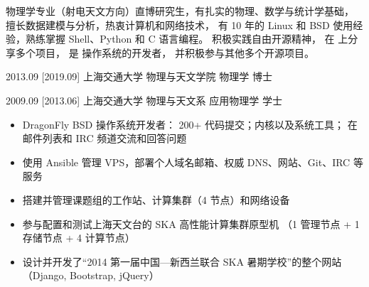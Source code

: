 \documentclass[zh]{resume}
\begin{document}
\makeheader

{\onehalfspacing\hspace{2em}%
物理学专业（射电天文方向）直博研究生，有扎实的物理、数学与统计学基础，
擅长数据建模与分析，热衷计算机和网络技术，
有 10 年的 Linux 和 BSD 使用经验，熟练掌握 Shell、Python 和 C 语言编程。
积极实践自由开源精神，
在  上分享多个项目，
是  操作系统的开发者，
并积极参与其他多个开源项目。
\par}

\begin{competences}
\end{competences}

\begin{educations}
  \education%
    {2013.09}%
    [2019.09]%
    {上海交通大学}%
    {物理与天文学院}%
    {物理学}%
    {博士}

  \separator{0.5ex}
  \education%
    {2009.09}%
    [2013.06]%
    {上海交通大学}%
    {物理与天文系}%
    {应用物理学}%
    {学士}
\end{educations}

\begin{itemize}
  \item DragonFly BSD 操作系统开发者：
    200+ 代码提交；内核以及系统工具；
    在邮件列表和 IRC 频道交流和回答问题
  \item 使用 Ansible 管理 VPS，部署个人域名邮箱、权威 DNS、网站、Git、IRC 等服务
  \item 搭建并管理课题组的工作站、计算集群（4 节点）和网络设备
  \item 参与配置和测试上海天文台的 SKA 高性能计算集群原型机
    （1 管理节点 + 1 存储节点 + 4 计算节点）
  \item 设计并开发了\enquote{2014 第一届中国—新西兰联合 SKA 暑期学校}的整个网站
    （Django, Bootstrap, jQuery）
\end{itemize}
\end{document}
